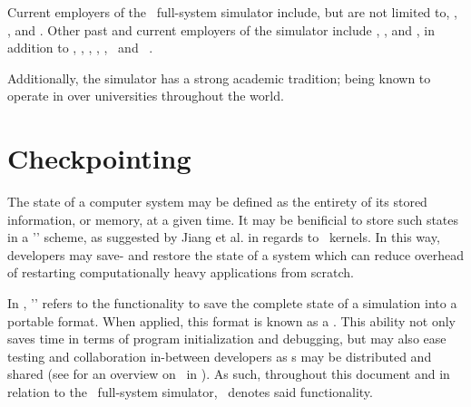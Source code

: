 Current employers of the \dvttermsimics\ full-system simulator include, but are not limited to, \dvttermibm {}, \dvttermnasa {}, and \dvttermintel {}.
Other past and current employers of the simulator include \dvttermsunmicrosystems , \dvttermericsson , and \dvttermhewlettpackard {}, in addition to \dvttermcisco , \dvttermfreescalesemiconductor , \dvttermgeavionics , \dvttermhoneywell , \dvttermlockheedmartin , \dvttermnortel\ and \dvttermnorthropgrumman\ .

Additionally, the simulator has a strong academic tradition; being known to operate in over  universities throughout the world.

\section*{Checkpointing}
\label{sec:appendixa_checkpointing}

The state of a computer system may be defined as the entirety of its stored information, or memory, at a given time.
It may be benificial to store such states in a '\dvttermcheckpointrestart ' scheme, as suggested by Jiang et al. in regards to \dvttermcuda\ kernels.
In this way, developers may save- and restore the state of a system which can reduce overhead of restarting computationally heavy applications from scratch.

In \dvttermsimics , '\dvttermcheckpointing ' refers to the functionality to save the complete state of a simulation into a portable format.
When applied, this format is known as a \dvttermcheckpoint .
This ability not only  saves time in terms of program initialization and debugging, but may also ease testing and collaboration in-between developers as \dvttermcheckpoint s may be distributed and shared (see  for an overview on \dvttermcheckpointing\ in \dvttermsimics ).
As such, throughout this document and in relation to the \dvttermsimics\ full-system simulator, \dvttermcheckpointing\ denotes said functionality.

